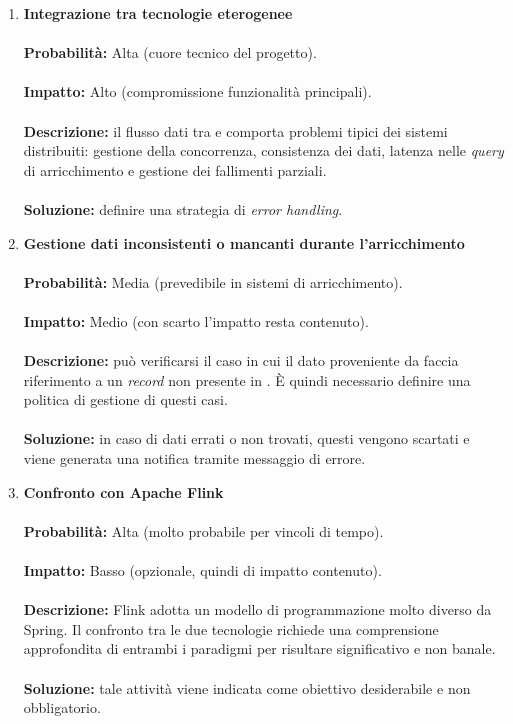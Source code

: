 \begin{enumerate}
    \newpage
    \item \textbf{Integrazione tra tecnologie eterogenee} \\ \\
        \textbf{Probabilità:} Alta (cuore tecnico del progetto). \\ \\
        \textbf{Impatto:} Alto (compromissione funzionalità principali). \\ \\
        \textbf{Descrizione:} il flusso dati tra  e  comporta problemi tipici dei sistemi distribuiti: gestione della concorrenza, consistenza dei dati, latenza nelle \textit{query} di arricchimento e gestione dei fallimenti parziali. \\ \\
        \textbf{Soluzione:} definire una strategia di \textit{error handling}.
    \item \textbf{Gestione dati inconsistenti o mancanti durante l'arricchimento} \\ \\
        \textbf{Probabilità:} Media (prevedibile in sistemi di arricchimento). \\ \\
        \textbf{Impatto:} Medio (con scarto l'impatto resta contenuto). \\ \\
        \textbf{Descrizione:} può verificarsi il caso in cui il dato proveniente da  faccia riferimento a un \textit{record} non presente in . È quindi necessario definire una politica di gestione di questi casi. \\ \\
        \textbf{Soluzione:} in caso di dati errati o non trovati, questi vengono scartati e viene generata una notifica tramite messaggio di errore.
    \item \textbf{Confronto con Apache Flink} \\ \\
        \textbf{Probabilità:} Alta (molto probabile per vincoli di tempo). \\ \\
        \textbf{Impatto:} Basso (opzionale, quindi di impatto contenuto). \\ \\
        \textbf{Descrizione:} Flink adotta un modello di programmazione molto diverso da Spring. Il confronto tra le due tecnologie richiede una comprensione approfondita di entrambi i paradigmi per risultare significativo e non banale. \\ \\
        \textbf{Soluzione:} tale attività viene indicata come obiettivo desiderabile e non obbligatorio.
\end{enumerate}

\newpage
